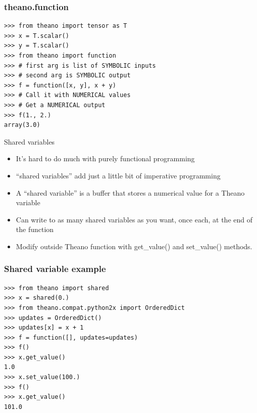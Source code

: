 \documentclass[utf8x,xcolor=pdftex,dvipsnames,table]{beamer}
\begin{document}
\begin{frame}[fragile]
  \frametitle{theano.function}

\begin{lstlisting}
>>> from theano import tensor as T
>>> x = T.scalar()
>>> y = T.scalar()
>>> from theano import function
>>> # first arg is list of SYMBOLIC inputs
>>> # second arg is SYMBOLIC output
>>> f = function([x, y], x + y)
>>> # Call it with NUMERICAL values
>>> # Get a NUMERICAL output
>>> f(1., 2.)
array(3.0)
\end{lstlisting}
\end{frame}

\begin{frame}{Shared variables}
  \begin{itemize}
  \item It’s hard to do much with purely functional programming
  \item ``shared variables'' add just a little bit of imperative programming
  \item A ``shared variable'' is a buffer that stores a numerical value for a Theano variable
  \item Can write to as many shared variables as you want, once each, at the end of the function
  \item  Modify outside Theano function with get\_value() and set\_value() methods.
  \end{itemize}
\end{frame}

\begin{frame}[fragile]
  \frametitle{Shared variable example}

\begin{lstlisting}
>>> from theano import shared
>>> x = shared(0.)
>>> from theano.compat.python2x import OrderedDict
>>> updates = OrderedDict()
>>> updates[x] = x + 1
>>> f = function([], updates=updates)
>>> f()
>>> x.get_value()
1.0
>>> x.set_value(100.)
>>> f()
>>> x.get_value()
101.0
\end{lstlisting}
\end{frame}
\end{document}
